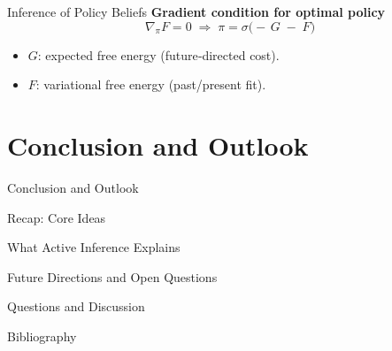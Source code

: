 \documentclass[aspectratio=1610, english]{beamer}
\begin{document}
\begin{frame}{Inference of Policy Beliefs}
    \textbf{Gradient condition for optimal policy}
    \[
      \nabla_{\pi}F = 0
      \;\Longrightarrow\;
      \pi 
      = \sigma\bigl(-\,G \;-\; F\bigr)
    \]
    \begin{itemize}
      \item \(G\): expected free energy (future‑directed cost).
      \item \(F\): variational free energy (past/present fit). 
    \end{itemize}
    \centering
    \vspace{1em}
\end{frame}

\section{Conclusion and Outlook}
\begin{frame}{Conclusion and Outlook}
    \sectionpage
\end{frame}

\begin{frame}{Recap: Core Ideas}
    
\end{frame}

\begin{frame}{What Active Inference Explains}
\end{frame}

\begin{frame}{Future Directions and Open Questions}
\end{frame}

\begin{frame}{Questions and Discussion}
\end{frame}

\begin{frame}{Bibliography}
{}

\end{frame}
\end{document}
